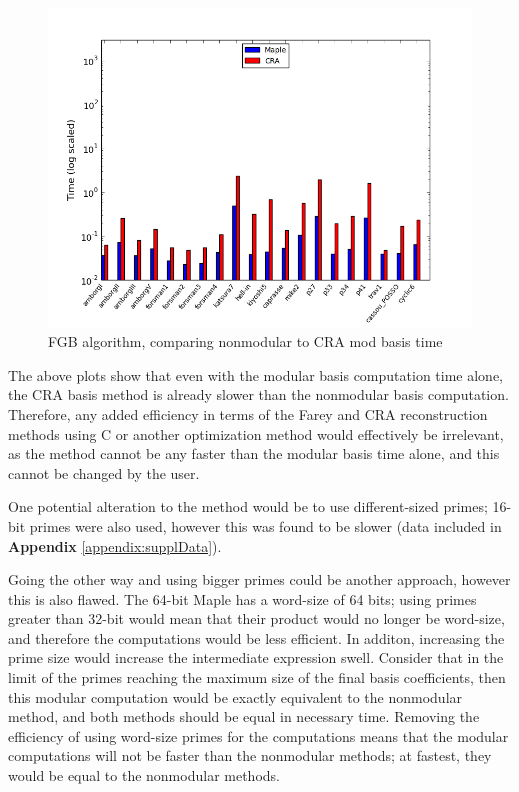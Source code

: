 \documentclass[letterpaper,12pt,titlepage,oneside,final]{book}
\begin{document}
\begin{figure}[H]
  \centering
  \includegraphics[scale=0.7]{fgb_mapleVsCRA_modBasisTime.png}
  \caption{FGB algorithm, comparing nonmodular to CRA mod basis time \label{fig:f4_tests}}
\end{figure}  

The above plots show that even with the modular basis computation time alone, the CRA basis method is already slower than the nonmodular basis computation.  Therefore, any added efficiency in terms of the Farey and CRA reconstruction methods using C or another optimization method would effectively be irrelevant, as the method cannot be any faster than the modular basis time alone, and this cannot be changed by the user.  

One potential alteration to the method would be to use different-sized primes; 16-bit primes were also used, however this was found to be slower (data included in \textbf{Appendix} \ref{appendix:supplData}).  

Going the other way and using bigger primes could be another approach, however this is also flawed.  The 64-bit Maple has a word-size of 64 bits; using primes greater than 32-bit would mean that their product would no longer be word-size, and therefore the computations would be less efficient.  In additon, increasing the prime size would increase the intermediate expression swell.  Consider that in the limit of the primes reaching the maximum size of the final basis coefficients, then this modular computation would be exactly equivalent to the nonmodular method, and both methods should be equal in necessary time.  Removing the efficiency of using word-size primes for the computations means that the modular computations will not be faster than the nonmodular methods; at fastest, they would be equal to the nonmodular methods.  
\end{document}
